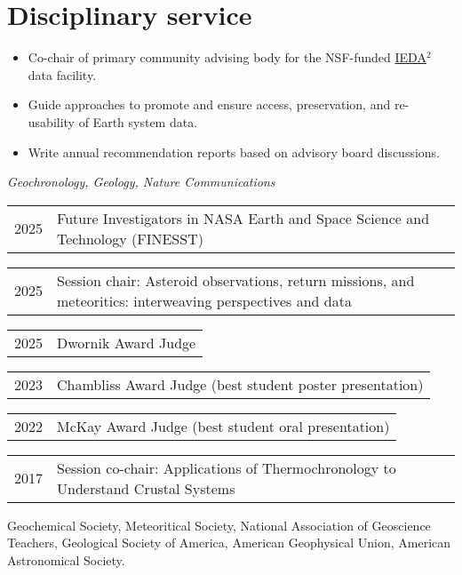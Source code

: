 \section{Disciplinary service}

\begin{itemize}
	\item Co-chair of primary community advising body for the NSF-funded \href{https://www.iedadata.org/}{IEDA$^2$} data facility.
	\item Guide approaches to promote and ensure access, preservation, and re-usability of Earth system data.
	\item Write annual recommendation reports based on advisory board discussions. 
\end{itemize}

\textit{Geochronology, Geology, Nature Communications}

\begin{tabular}{ll} 
	2025 & Future Investigators in NASA Earth and Space Science and Technology (FINESST)
\end{tabular}


\begin{tabular}{ll} 
	2025 & Session chair: \small Asteroid observations, return missions, and meteoritics: interweaving perspectives and data
\end{tabular}

\begin{tabular}{ll} 
	2025 & Dwornik Award Judge
\end{tabular}

\begin{tabular}{ll} 
	2023 & Chambliss Award Judge (best student poster presentation)
\end{tabular}

\begin{tabular}{ll} 
	2022 & 	McKay Award Judge (best student oral presentation)
\end{tabular}

\begin{tabular}{ll} 
	2017 & 	Session co-chair: \small Applications of Thermochronology to Understand Crustal Systems
\end{tabular}

Geochemical Society, Meteoritical Society, National Association of Geoscience Teachers, Geological Society of America, American Geophysical Union, American Astronomical Society.